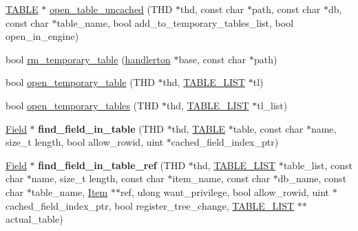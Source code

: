 \begin{DoxyCompactItemize}
\item 
\mbox{\hyperlink{structTABLE}{T\+A\+B\+LE}} $\ast$ \mbox{\hyperlink{group__Data__Dictionary_ga35659d6f0f8a6d39ee3f3db7c233df52}{open\+\_\+table\+\_\+uncached}} (T\+HD $\ast$thd, const char $\ast$path, const char $\ast$db, const char $\ast$table\+\_\+name, bool add\+\_\+to\+\_\+temporary\+\_\+tables\+\_\+list, bool open\+\_\+in\+\_\+engine)
\item 
bool \mbox{\hyperlink{group__Data__Dictionary_ga2f6730cd1feb3014042adbf998ca9203}{rm\+\_\+temporary\+\_\+table}} (\mbox{\hyperlink{structhandlerton}{handlerton}} $\ast$base, const char $\ast$path)
\item 
bool \mbox{\hyperlink{group__Data__Dictionary_gab5c68673b37e4f394de31ffe4ac80fcc}{open\+\_\+temporary\+\_\+table}} (T\+HD $\ast$thd, \mbox{\hyperlink{structTABLE__LIST}{T\+A\+B\+L\+E\+\_\+\+L\+I\+ST}} $\ast$tl)
\item 
bool \mbox{\hyperlink{group__Data__Dictionary_gac4c1cb71807d09d53273048447abf301}{open\+\_\+temporary\+\_\+tables}} (T\+HD $\ast$thd, \mbox{\hyperlink{structTABLE__LIST}{T\+A\+B\+L\+E\+\_\+\+L\+I\+ST}} $\ast$tl\+\_\+list)
\item 
\mbox{\label{group__Data__Dictionary_gacac9a77ae494a701599bc5e1856f766c}} 
\mbox{\hyperlink{classField}{Field}} $\ast$ {\bfseries find\+\_\+field\+\_\+in\+\_\+table} (T\+HD $\ast$thd, \mbox{\hyperlink{structTABLE}{T\+A\+B\+LE}} $\ast$table, const char $\ast$name, size\+\_\+t length, bool allow\+\_\+rowid, uint $\ast$cached\+\_\+field\+\_\+index\+\_\+ptr)
\item 
\mbox{\label{group__Data__Dictionary_ga53b8b9fd8dfbbaa3cdc71df88ff3e5d4}} 
\mbox{\hyperlink{classField}{Field}} $\ast$ {\bfseries find\+\_\+field\+\_\+in\+\_\+table\+\_\+ref} (T\+HD $\ast$thd, \mbox{\hyperlink{structTABLE__LIST}{T\+A\+B\+L\+E\+\_\+\+L\+I\+ST}} $\ast$table\+\_\+list, const char $\ast$name, size\+\_\+t length, const char $\ast$item\+\_\+name, const char $\ast$db\+\_\+name, const char $\ast$table\+\_\+name, \mbox{\hyperlink{classItem}{Item}} $\ast$$\ast$ref, ulong want\+\_\+privilege, bool allow\+\_\+rowid, uint $\ast$cached\+\_\+field\+\_\+index\+\_\+ptr, bool register\+\_\+tree\+\_\+change, \mbox{\hyperlink{structTABLE__LIST}{T\+A\+B\+L\+E\+\_\+\+L\+I\+ST}} $\ast$$\ast$actual\+\_\+table)
\item 
\mbox{\label{group__Data__Dictionary_ga795c727f9014b6fd6d0eed974e26c5c3}} 

\end{DoxyCompactItemize}
